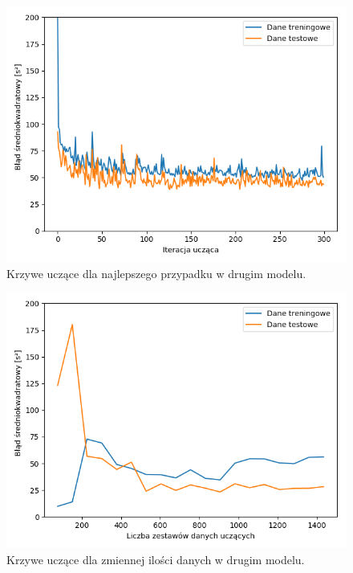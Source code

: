 \documentclass[12pt]{aghdpl}
\newenvironment{tightcenter}{
  \setlength\topsep{0pt}
  \setlength\parskip{0pt}
  \begin{center}
}{
  \end{center}
}
\begin{document}
		\begin{figure}[h]
			\begin{tightcenter}
	 			\includegraphics[width = \linewidth]{wykresy/3_drugi_model_tworzenie_i_analiza/wykres_uczenia.png}
	 		\end{tightcenter}
	 		
 			\caption{Krzywe uczące dla najlepszego przypadku w drugim modelu.}
			\label{fig: drugi_model_wykres_uczenia}
		\end{figure}
		
		\begin{figure}[h]
			\begin{tightcenter}
	 			\includegraphics[width = \linewidth]{wykresy/3_drugi_model_tworzenie_i_analiza/learning_curves.png}
	 		\end{tightcenter}
	 		
 			\caption{Krzywe uczące dla zmiennej ilości danych w drugim modelu.}
			\label{fig: drugi_model_learning_curves}
		\end{figure}
		
\end{document}
